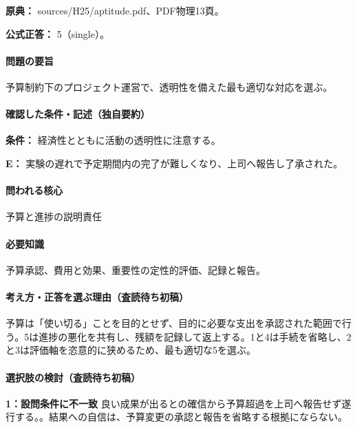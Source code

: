 \noindent\textbf{原典：} sources/H25/aptitude.pdf、PDF物理13頁。

\textbf{公式正答：} 5（single）。

\paragraph{問題の要旨} 予算制約下のプロジェクト運営で、透明性を備えた最も適切な対応を選ぶ。

\paragraph{確認した条件・記述（独自要約）}\mbox{}\par

\noindent\textbf{条件：} 経済性とともに活動の透明性に注意する。\par

\noindent\textbf{E：} 実験の遅れで予定期間内の完了が難しくなり、上司へ報告し了承された。\par

\paragraph{問われる核心} 予算と進捗の説明責任

\paragraph{必要知識} 予算承認、費用と効果、重要性の定性的評価、記録と報告。

\paragraph{考え方・正答を選ぶ理由（査読待ち初稿）} 予算は「使い切る」ことを目的とせず、目的に必要な支出を承認された範囲で行う。5は進捗の悪化を共有し、残額を記録して返上する。1と4は手続を省略し、2と3は評価軸を恣意的に狭めるため、最も適切な5を選ぶ。

\paragraph{選択肢の検討（査読待ち初稿）}\mbox{}\par

\noindent\textbf{1：設問条件に不一致} 良い成果が出るとの確信から予算超過を上司へ報告せず遂行する。。結果への自信は、予算変更の承認と報告を省略する根拠にならない。\par

